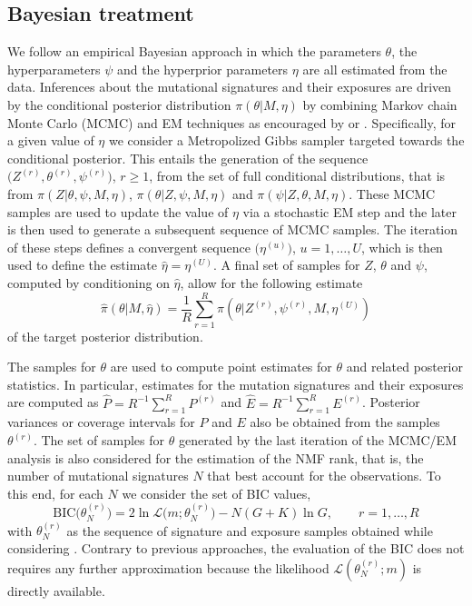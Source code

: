 \documentclass{bioinfo}
\begin{document}
\subsection{Bayesian treatment}
We follow an empirical Bayesian approach in which the parameters
$\theta$, the hyperparameters $\psi$ and the hyperprior parameters
$\eta$ are all estimated from the data.  Inferences about the
mutational signatures and their exposures are driven by the
conditional posterior distribution $\pi(\theta|M, \eta)$ by combining
Markov chain Monte Carlo (MCMC) and EM techniques as
encouraged by \cite{C01} or \cite{LC}. Specifically, for a given value
of $\eta$ we consider a Metropolized Gibbs sampler targeted towards
the conditional posterior. This entails the generation of the sequence
$\big(Z^{(r)}, \theta^{(r)}, \psi^{(r)}\big)$, $r \geqslant 1$,
from the set of full conditional distributions, that is from $\pi(Z|
\theta, \psi, M, \eta)$, $\pi(\theta| Z, \psi, M, \eta)$ and
$\pi(\psi| Z, \theta, M, \eta)$. These MCMC samples are used to update
the value of $\eta$ via a stochastic EM step and the later is then
used to generate a subsequent sequence of MCMC samples. The iteration
of these steps defines a convergent sequence $\big(\eta^{(u)}\big)$,
$u = 1, \ldots, U$, which is then used to define the estimate
$\hat\eta = \eta^{(U)}$. A final set of samples for $Z$, $\theta$ and
$\psi$, computed by conditioning on $\hat\eta$, allow for the
following estimate
\begin{equation}
 \label{eqn:MCEM_estimate}
   \widehat{\pi}(\theta|M, \hat\eta)
 = 
   \frac{1}{R}\sum_{r=1}^R \pi(\theta|Z^{(r)}, \psi^{(r)}, M,
   \eta^{(U)})
\end{equation}
of the target posterior distribution.


The samples for $\theta$ are used to compute point estimates for
$\theta$ and related posterior statistics. In particular, estimates
for the mutation signatures and their exposures are computed as
$\widehat P = R^{-1}\sum_{r=1}^R P^{(r)}$ and $\widehat E =
R^{-1}\sum_{r=1}^R E^{(r)}$. Posterior variances or coverage intervals
for $P$ and $E$ also be obtained from the samples $\theta^{(r)}$. The
set of samples for $\theta$ generated by the last iteration of the
MCMC/EM analysis is also considered for the estimation of the NMF
rank, that is, the number of mutational signatures $N$ that best
account for the observations. To this end, for each $N$ we consider
the set of BIC values,
\[
  \text{BIC}\big(\theta^{(r)}_N\big) = 2\ln\mathcal L\big(m;
    \theta^{(r)}_{N}\big) - N(G+K)\ln G, \qquad r =1, \ldots,
    R
\]
with $\theta^{(r)}_N$ as the sequence of signature and exposure
samples obtained while considering . Contrary to previous approaches,
the evaluation of the BIC does not requires any further approximation
because the likelihood $\mathcal L(\theta^{(r)}_N; m)$ is directly 
available.
\end{document}
